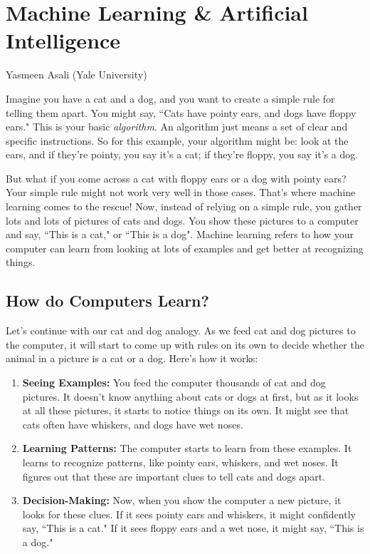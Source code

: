\section{Machine Learning \& Artificial Intelligence}
\begin{sectionauthor}
    Yasmeen Asali (Yale University)
\end{sectionauthor}
\vspace{20pt}


\noindent Imagine you have a cat and a dog, and you want to create a simple rule for telling them apart. You might say, ``Cats have pointy ears, and dogs have floppy ears." This is your basic \textit{algorithm}. An algorithm just means a set of clear and specific instructions. So for this example, your algorithm might be: look at the ears, and if they're pointy, you say it's a cat; if they're floppy, you say it's a dog.

But what if you come across a cat with floppy ears or a dog with pointy ears? Your simple rule might not work very well in those cases. That's where machine learning comes to the rescue! Now, instead of relying on a simple rule, you gather lots and lots of pictures of cats and dogs. You show these pictures to a computer and say, ``This is a cat," or ``This is a dog". Machine learning refers to how your computer can learn from looking at lots of examples and get better at recognizing things.

\subsection{How do Computers Learn?}

Let's continue with our cat and dog analogy. As we feed cat and dog pictures to the computer, it will start to come up with rules on its own to decide whether the animal in a picture is a cat or a dog. Here's how it works:
\begin{enumerate}
    \item \textbf{Seeing Examples:} You feed the computer thousands of cat and dog pictures. It doesn't know anything about cats or dogs at first, but as it looks at all these pictures, it starts to notice things on its own. It might see that cats often have whiskers, and dogs have wet noses.
    \item \textbf{Learning Patterns:} The computer starts to learn from these examples. It learns to recognize patterns, like pointy ears, whiskers, and wet noses. It figures out that these are important clues to tell cats and dogs apart.
    \item \textbf{Decision-Making:} Now, when you show the computer a new picture, it looks for these clues. If it sees pointy ears and whiskers, it might confidently say, ``This is a cat." If it sees floppy ears and a wet nose, it might say, ``This is a dog."
\end{enumerate}


